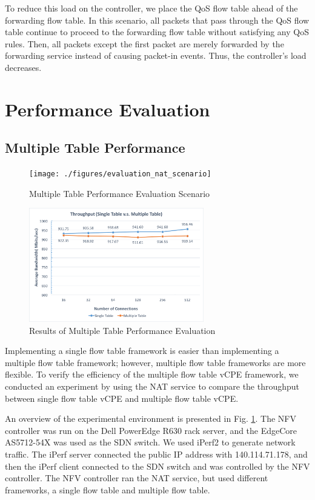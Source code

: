 \documentclass[conference]{IEEEtran}
\begin{document}
To reduce this load on the controller, we place the QoS flow table ahead of the forwarding flow table. In this scenario, all packets that pass through the QoS flow table continue to proceed to the forwarding flow table without satisfying any QoS rules. Then, all packets except the first packet are merely forwarded by the forwarding service instead of causing packet-in events. Thus, the controller’s load decreases.

\section{Performance Evaluation}
\subsection{Multiple Table Performance}

\begin{figure}[!t]
\centering
\texttt{[image: ./figures/evaluation\_nat\_scenario]}
\caption{Multiple Table Performance Evaluation Scenario}
\label{fig:evaluation_nat_scenario}
\end{figure}

\begin{figure}[!t]
\centering
\includegraphics[width=3in]{./figures/evaluation_nat}
\caption{Results of Multiple Table Performance Evaluation}
\label{fig:evaluation_nat_result}
\end{figure}

Implementing a single flow table framework is easier than implementing a multiple flow table framework; however, multiple flow table frameworks are more flexible. To verify the efficiency of the multiple flow table vCPE framework, we conducted an experiment by using the NAT service to compare the throughput between single flow table vCPE and multiple flow table vCPE.

An overview of the experimental environment is presented in Fig. \ref{fig:evaluation_nat_scenario}. The NFV controller was run on the Dell PowerEdge R630 rack server, and the EdgeCore AS5712-54X \cite{edge-core-switch} was used as the SDN switch.
We used iPerf2 \cite{iperf} to generate network traffic. The iPerf server connected the public IP address with 140.114.71.178, and then the iPerf client connected to the SDN switch and was controlled by the NFV controller.
The NFV controller ran the NAT service, but used different frameworks, a single flow table and multiple flow table.
\end{document}
